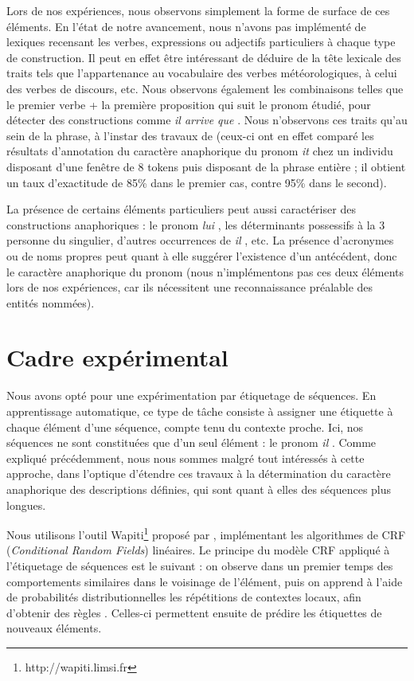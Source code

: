 \documentclass[a4paper,12pt]{article}
\begin{document}
Lors de nos expériences, nous observons simplement la forme de surface de ces éléments. En l'état de notre avancement, nous n'avons pas implémenté de lexiques recensant les verbes, expressions ou adjectifs particuliers à chaque type de construction. Il peut en effet être intéressant de déduire de la tête lexicale des traits tels que l'appartenance au vocabulaire des verbes météorologiques, à celui des verbes de discours, etc.
Nous observons également les combinaisons telles que le premier verbe + la première proposition qui suit le pronom étudié, pour détecter des constructions comme \og \textit{il arrive que} \fg{}. Nous n'observons ces traits qu'au sein de la phrase, à l'instar des travaux de \citeauthor{Bergsma-11} (ceux-ci ont en effet comparé les résultats d'annotation du caractère anaphorique du pronom \og{}\textit{it}\fg{} chez un individu disposant d'une fenêtre de 8 tokens puis disposant de la phrase entière ; il obtient un taux d'exactitude de 85\% dans le premier cas, contre 95\% dans le second).

La présence de certains éléments particuliers peut aussi caractériser des constructions anaphoriques : le pronom \og \textit{lui} \fg{}, les déterminants possessifs à la 3 personne du singulier, d'autres occurrences de \og \textit{il} \fg{}, etc. La présence d'acronymes ou de noms propres peut quant à elle suggérer l'existence d'un antécédent, donc le caractère anaphorique du pronom (nous n'implémentons pas ces deux éléments lors de nos expériences, car ils nécessitent une reconnaissance préalable des entités nommées).


\section{Cadre expérimental}
\label{xp}

Nous avons opté pour une expérimentation par étiquetage de séquences. En apprentissage automatique, ce type de tâche consiste à assigner une étiquette à chaque élément d'une séquence, compte tenu du contexte proche. Ici, nos séquences ne sont constituées que d'un seul élément : le pronom \og \textit{il} \fg{}. Comme expliqué précédemment, nous nous sommes malgré tout intéressés à cette approche, dans l'optique d'étendre ces travaux à la détermination du caractère anaphorique des descriptions définies, qui sont quant à elles des séquences plus longues. 

Nous utilisons l'outil Wapiti\footnote{http://wapiti.limsi.fr} proposé par \citet{lavergne2010practical}, implémentant les algorithmes de CRF (\textit{Conditional Random Fields}) linéaires.
Le principe du modèle CRF appliqué à l'étiquetage de séquences est le suivant : on observe dans un premier temps des comportements similaires dans le voisinage de l'élément, puis on apprend à l'aide de probabilités distributionnelles les répétitions de contextes locaux, afin d'obtenir des \og règles \fg{}. Celles-ci permettent ensuite de prédire les étiquettes de nouveaux éléments.
\end{document}
